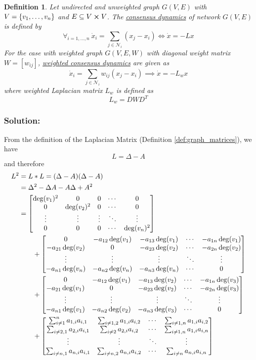 \documentclass[]{article}
\numberwithin{equation}{section}
\newtheorem{definition}{Definition}
\begin{document}
\begin{definition} \label{def:consensus_dynamics}
	Let undirected and unweighted graph $G(V,E)$ with $V = \qty{v_1,\dots,v_n}$ and $E \subseteq V \cross V$.
	The \emph{\underline{consensus dynamics}} of network $G(V,E)$ is defined by\[
		\forall_{i=1,\dots,n} \ \dot{x}_i = \sum_{j\in \mathcal{N}_i} (x_j - x_i)
		\iff \dot{x} = -L x
	\] For the case with weighted graph $G(V,E,W)$ with diagonal weight matrix $W = [w_{ij}]$, 
	\emph{\underline{weighted consensus dynamics}} are given as\[
		\dot{x}_i = \sum_{j\in\mathcal{N}_i} w_{ij} (x_j - x_i) 
		\implies \dot{x} = - L_{w} x
	\]where weighted Laplacian matrix $L_{w}$ is defined as\[
		L_{w} = D W D^T
	\]
\end{definition}


\subsubsection*{Solution:}
From the definition of the Laplacian Matrix (Definition \ref{def:graph_matrices}), we have\[
    L = \Delta - A
\] and therefore \begin{align*}
    L^2 &= L * L = (\Delta - A) (\Delta - A)\\
        &= \Delta^2 - \Delta A - A \Delta + A^2\\
        &= \mqty[
            \deg(v_1)^2	&0	&0	&\cdots	&0\\
            0		&\deg(v_2)^2	&0	&\cdots	&0\\
            \vdots		&\vdots		&\vdots		&\ddots	&\vdots\\
            0		&0	&0	&\cdots	&\deg(v_n)^2
        ] \\ &\qquad + \mqty[
            0	&-a_{12} \deg(v_1)	&-a_{13} \deg(v_1)	&\cdots	&-a_{1n} \deg(v_1)\\
            -a_{21}	\deg(v_2)	&0	&-a_{23} \deg(v_2)	&\cdots	&-a_{2n} \deg(v_2)\\
            \vdots		&\vdots		&\vdots		&\ddots	&\vdots\\
            -a_{n1}	\deg(v_n)	&-a_{n2} \deg(v_n)	&-a_{n3} \deg(v_n)	&\cdots	&0
        ] \\ &\qquad + \mqty[
            0	&-a_{12} \deg(v_1)	&-a_{13} \deg(v_2)	&\cdots	&-a_{1n} \deg(v_3)\\
            -a_{21}	\deg(v_1)	&0	&-a_{23} \deg(v_2)	&\cdots	&-a_{2n} \deg(v_3)\\
            \vdots		&\vdots		&\vdots		&\ddots	&\vdots\\
            -a_{n1}	\deg(v_1)	&-a_{n2} \deg(v_2)	&-a_{n3} \deg(v_3)	&\cdots	&0
        ] \\ &\qquad + \mqty[
            \sum_{i \neq 1}^n a_{1,i} a_{i,1} & \sum_{i \neq 1,2} a_{1,i} a_{i,2} & \cdots &\sum_{i \neq 1,n} a_{1,i} a_{i,2}\\
            \sum_{i \neq 2,1} a_{2,i} a_{i,1} & \sum_{i \neq 2} a_{2,i} a_{i,2} & \cdots & \sum_{i \neq 1,n} a_{1,i} a_{i,n}\\
            \vdots  &  \vdots &\ddots &\vdots\\
            \sum_{i \neq n,1} a_{n,i} a_{i,1} & \sum_{i \neq n,2} a_{n,i} a_{i,2} &\cdots &\sum_{i\neq n} a_{n,i} a_{i,n}
        ]
\end{align*}
\end{document}
